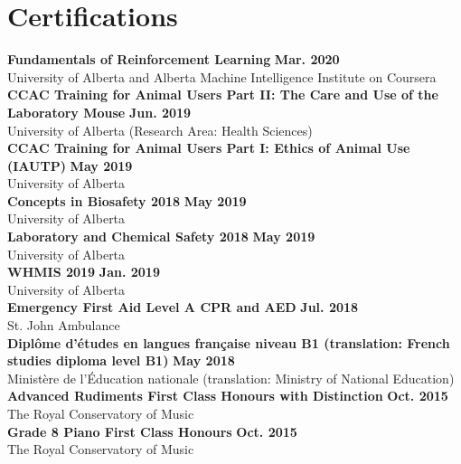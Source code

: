 \documentclass{article}
\begin{document}
\section*{Certifications}
    \textbf{Fundamentals of Reinforcement Learning} \hfill \textbf{Mar. 2020}\\
    University of Alberta and Alberta Machine Intelligence Institute on Coursera\\[0.5em]
    \textbf{CCAC Training for Animal Users Part II: The Care and Use of the Laboratory Mouse} \hfill \textbf{Jun. 2019}\\
    University of Alberta (Research Area: Health Sciences)\\[0.5em]
    \textbf{CCAC Training for Animal Users Part I: Ethics of Animal Use (IAUTP)} \hfill \textbf{May 2019}\\
    University of Alberta\\[0.5em]
    \textbf{Concepts in Biosafety 2018} \hfill \textbf{May 2019}\\
    University of Alberta\\[0.5em]
    \textbf{Laboratory and Chemical Safety 2018} \hfill \textbf{May 2019}\\
    University of Alberta\\[0.5em]
    \textbf{WHMIS 2019} \hfill \textbf{Jan. 2019}\\
    University of Alberta\\[0.5em]
    \textbf{Emergency First Aid Level A CPR and AED} \hfill \textbf{Jul. 2018}\\
    St. John Ambulance\\[0.5em]
    \textbf{Dipl\^ome d'\'etudes en langues fran\c{c}aise niveau B1 (translation: French studies diploma level B1)} \hfill \textbf{May 2018}\\
    Minist\`ere de l'\'Education nationale (translation: Ministry of National Education)\\[0.5em]
    \textbf{Advanced Rudiments First Class Honours with Distinction} \hfill \textbf{Oct. 2015}\\
    The Royal Conservatory of Music\\[0.5em]
    \textbf{Grade 8 Piano First Class Honours} \hfill \textbf{Oct. 2015}\\
    The Royal Conservatory of Music


\end{document}
